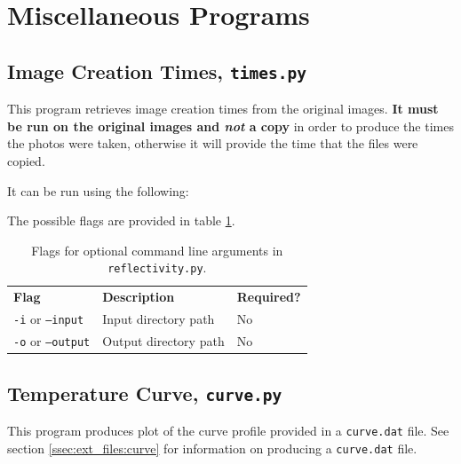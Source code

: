 \pagebreak
\section{Miscellaneous Programs}

\subsection{Image Creation Times, \texttt{times.py}}\label{ssec:misc:times}
This program retrieves image creation times from the original images. \textbf{It must be run on the original images and \textit{not} a copy} in order to produce the times the photos were taken, otherwise it will provide the time that the files were copied.

It can be run using the following:


The possible flags are provided in table \ref{tab:misc:times:flags}.

\begin{table}[H]
	\begin{center}
		\begin{tabular}{l l l}
			\hline
			\textbf{Flag}	&	\textbf{Description}	&	\textbf{Required?}\\
			\texttt{-i} or \texttt{--input}		& Input directory path	&	No	\\
			\texttt{-o} or \texttt{--output}	& Output directory path	&	No	\\
			\hline
		\end{tabular}
	\end{center}
	\caption[Misc, times flags.]{\label{tab:misc:times:flags}%
		Flags for optional command line arguments in \texttt{reflectivity.py}.%
	}
\end{table}


\subsection{Temperature Curve, \texttt{curve.py}}
This program produces plot of the curve profile provided in a \texttt{curve.dat} file. See section \ref{ssec:ext_files:curve} for information on producing a \texttt{curve.dat} file.

